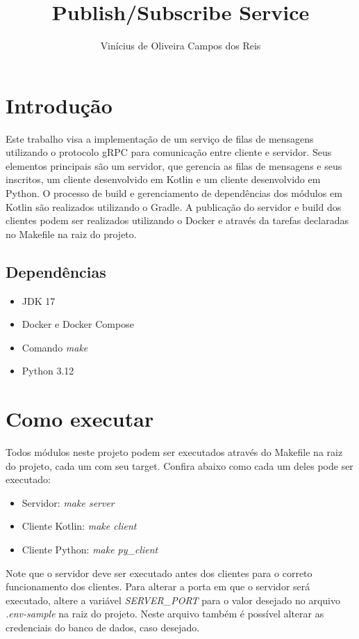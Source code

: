 \documentclass{article}
\title{Publish/Subscribe Service}
\author{Vinícius de Oliveira Campos dos Reis}
\begin{document}
\maketitle

\section{Introdução}

Este trabalho visa a implementação de um serviço de filas de mensagens utilizando o protocolo gRPC para comunicação
entre cliente e servidor. Seus elementos principais são um servidor, que gerencia as filas de mensagens e seus 
inscritos, um cliente desenvolvido em Kotlin e um cliente desenvolvido em Python. O processo de build e gerenciamento de dependências dos módulos em Kotlin são realizados utilizando o Gradle. A publicação do servidor e build dos clientes podem ser realizados utilizando o Docker e através da tarefas declaradas no Makefile na raiz do projeto.

\subsection{Dependências}

\begin{itemize}
    \item JDK 17
    \item Docker e Docker Compose
    \item Comando \textit{make}
    \item Python 3.12
\end{itemize}

\section{Como executar}

Todos módulos neste projeto podem ser executados através do Makefile na raiz do projeto, cada um com seu target.
Confira abaixo como cada um deles pode ser executado:

\begin{itemize}
    \item Servidor: \textit{make server}
    \item Cliente Kotlin: \textit{make client}
    \item Cliente Python: \textit{make py\_client}
\end{itemize}

Note que o servidor deve ser executado antes dos clientes para o correto funcionamento dos clientes. Para alterar
a porta em que o servidor será executado, altere a variável \textit{SERVER\_PORT} para o valor desejado no arquivo 
\textit{.env-sample} na raiz do projeto. Neste arquivo também é possível alterar as credenciais do banco de dados, caso desejado.
\end{document}
